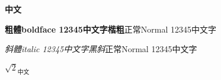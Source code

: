 \documentclass{article}
\begin{document}
\textbf{中文}

\textbf{粗體boldface 12345中文字{\Kai 楷粗}}正常Normal 12345中文字

\textit{斜體italic 12345中文字{\Hei 黑斜}}\:正常Normal 12345中文字

$\sqrt{2}_{\text{中文}}$  %
\end{document}
